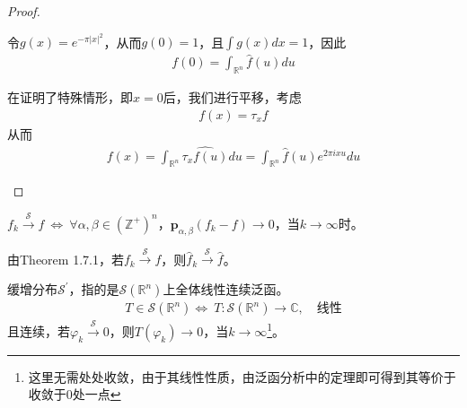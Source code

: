 \begin{proof}
\begin{enumerate}[leftmargin=1cm, label=\arabic*]
        令$g(x) = e^{-\pi |x|^2}$，从而$g(0) = 1$，且$\int g(x) dx = 1$，因此
        \begin{align*}
            f(0) = \int_{\mathbb{R}^n} \hat{f}(u) du
        \end{align*}

        在证明了特殊情形，即$x=0$后，我们进行平移，考虑
        \begin{align*}
            f(x) = \tau_x f
        \end{align*}
        从而
        \begin{align*}
            f(x) = \int_{\mathbb{R}^n} \widehat{\tau_x f(u)} du = \int_{\mathbb{R}^n} \hat{f}(u) e^{2\pi i x u} du
        \end{align*}
    \end{enumerate} 
\end{proof}

\begin{example}
    $f_k\overset{\mathcal{S}}{\to} f\ \Longleftrightarrow\ \forall\alpha,\beta\in(\mathbb{Z}^+)^n$，$\boldsymbol{p}_{\alpha,\beta}(f_k - f) \to 0$，当$k\to\infty$时。
\end{example}
\begin{remark}
    由Theorem 1.7.1，若$f_k \overset{\mathcal{S}}{\to} f$，则$\hat{f}_k \overset{\mathcal{S}}{\to} \hat{f}$。
\end{remark}


\begin{definition}
    缓增分布$\mathcal{S}^{\prime}$，指的是$\mathcal{S}(\mathbb{R}^n)$上全体线性连续泛函。
    \begin{align*}
        T\in \mathcal{S}(\mathbb{R}^n) \Longleftrightarrow\ T:\mathcal{S}(\mathbb{R}^n) \to \mathbb{C},\quad \text{线性}
    \end{align*}
    且连续，若$\varphi_k\overset{\mathcal{S}}{\to} 0$，则$T(\varphi_k)\to 0$，当$k\to\infty$\footnote{这里无需处处收敛，由于其线性性质，由泛函分析中的定理即可得到其等价于收敛于0处一点}。
\end{definition}

